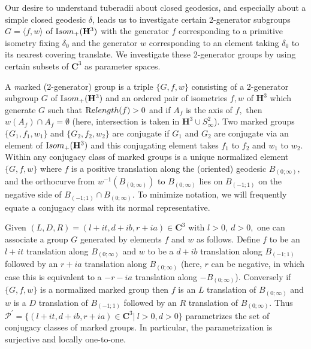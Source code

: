 
\begin{definition} \label{GMT 1.8}
Our desire to understand tuberadii about closed geodesics, and especially about a simple closed geodesic $\delta$, leads us to investigate certain 2-generator subgroups $G =
\langle f,w\rangle$  of ${\textrm Isom}_+({\mathbf H}^3)$ with the generator $f$ corresponding to a primitive isometry fixing $\delta_0$ and the generator
$w$ corresponding to an element taking $\delta_0$ to its nearest covering translate.  We investigate these 2-generator groups by using certain
subsets of ${\mathbf C}^3$ as parameter spaces.

A {\textit marked {\textrm (2-}generator\/{\textrm )} group} is a triple $\{G,f,w\}$ consisting of a 2-generator subgroup $G$ of ${\textrm Isom}_+({\mathbf H}^3)$
and an ordered pair of isometries $f,w$ of ${\mathbf H}^3$ which generate $G$  such that ${\textrm Relength}(f) > 0$ and if $A_f$ is the axis of $f,$ then $w(A_f)
\cap A_f  = \emptyset$  (here, intersection is taken in ${\mathbf H}^3 \cup S^2_\infty$). Two marked groups $\{G_1,f_1,w_1\}$ and $\{G_2,f_2,w_2\}$
are {\textit conjugate} if $G_1$ and $G_2$ are conjugate via an element of ${\textrm Isom}_+({\mathbf H}^3)$ and this conjugating element takes $f_1$ to $f_2$
and
$w_1$ to $w_2.$  Within any conjugacy class of marked groups is a unique normalized element
$\{G,f,w\}$ where $f$ is a
positive translation  along the (oriented) geodesic $B_{(0;\infty)},$  and the
orthocurve from $w^{-1}(B_{(0;\infty)})$ to $B_{(0;\infty)}$ lies on 
$ B_{(-1;1)}$
on the negative side of $ B_{(-1;1)}\cap B_{(0;\infty)}.$  
To minimize notation, we will frequently equate a conjugacy class with its normal representative.
\end{definition}

Given $(L,D,R)=(l+it, d+ib, r+ia)\in{\mathbf C}^3$ with $l > 0,\ d > 0,$ one  can associate a group $G$ generated by  elements $f$ and $w$ as follows.  Define $f$ to be an $l+it$ translation along $B_{(0;\infty)}$ and $w$ to be a $d+ib$ translation along $ B_{(-1;1)}$ followed by an $r+ia$ translation along $B_{(0;\infty)}$ (here, $r$ can be negative, in which case this is equivalent to
a
$-r-ia$ translation along $-B_{(0;\infty)}$).  Conversely if $\{G,f,w\}$ is a normalized marked group then $f$ is an $L$ translation of $B_{(0;\infty)}$
and $w$ is a $D$ translation of 
$ B_{(-1;1)}$ followed by an $R$ translation of $B_{(0;\infty)}.$ Thus
${\mathcal P}^\prime = \{(l+it,d+ib,r+ia)\in {\mathbf C}^3 | \ l>0, d>0\}$ 
parametrizes the
set of conjugacy classes of marked groups.  In particular, the parametrization is surjective and locally one-to-one.

